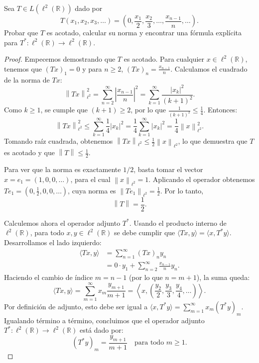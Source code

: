 \documentclass{article}
\theoremstyle{definition}
\newcommand{\R}{\mathbb{R}}
\newcommand{\norm}[1]{\left\lVert #1 \right\rVert}       %
\newenvironment{ejercicio}[1]{\begin{trivlist}
\item[\hskip \labelsep {\bfseries Ejercicio}\hskip \labelsep {\bfseries #1.}]}{\end{trivlist}}
\begin{document}
\begin{ejercicio}{7}
	Sea \( T\in L(\ell^{2}(\R)) \) dado por
	\[ T(x_{1},x_{2},x_{3},\dots) = \left( 0, \frac{x_{1}}{2}, \frac{x_{2}}{3}, \dots, \frac{x_{n-1}}{n}, \dots \right). \]
	Probar que \( T \) es acotado, calcular su norma y encontrar una fórmula explícita para \( T^{*}:\ell^{2}(\R)\rightarrow \ell^{2}(\R) \).
\end{ejercicio}
\begin{proof}
	Empecemos demostrando que \(T\) es acotado. Para cualquier \(x \in \ell^2(\R)\), tenemos que \((Tx)_1 = 0\) y para \(n \ge 2\), \((Tx)_n = \frac{x_{n-1}}{n}\). Calculamos el cuadrado de la norma de \(Tx\):
	\[
		\norm{Tx}_{\ell^2}^2 = \sum_{n=2}^{\infty} \left| \frac{x_{n-1}}{n} \right|^2 = \sum_{k=1}^{\infty} \frac{|x_k|^2}{(k+1)^2}.
	\]
	Como \(k \ge 1\), se cumple que \((k+1) \ge 2\), por lo que \(\frac{1}{(k+1)^2} \le \frac{1}{4}\). Entonces:
	\[
		\norm{Tx}_{\ell^2}^2 \le \sum_{k=1}^{\infty} \frac{1}{4} |x_k|^2 = \frac{1}{4} \sum_{k=1}^{\infty} |x_k|^2 = \frac{1}{4} \norm{x}_{\ell^2}^2.
	\]
	Tomando raíz cuadrada, obtenemos \(\norm{Tx}_{\ell^2} \le \frac{1}{2} \norm{x}_{\ell^2}\), lo que demuestra que \(T\) es acotado y que \(\norm{T} \le \frac{1}{2}\).

	Para ver que la norma es exactamente \(1/2\), basta tomar el vector \(x = e_1 = (1, 0, 0, \dots)\), para el cual \(\norm{x}_{\ell^2} = 1\). Aplicando el operador obtenemos \(Te_1 = \left( 0, \frac{1}{2}, 0, 0, \dots \right)\), cuya norma es \(\norm{Te_1}_{\ell^2} = \frac{1}{2}\). Por lo tanto,
	\[
		\norm{T} = \frac{1}{2}.
	\]

	Calculemos ahora el operador adjunto \(T^*\). Usando el producto interno de \(\ell^2(\R)\), para todo \(x, y \in \ell^2(\R)\) se debe cumplir que \( \langle Tx, y \rangle = \langle x, T^*y \rangle \). Desarrollamos el lado izquierdo:
	\begin{align*}
		\langle Tx, y \rangle & = \sum_{n=1}^{\infty} {(Tx)}_n y_n                         \\
		                      & = 0 \cdot y_1 + \sum_{n=2}^{\infty} \frac{x_{n-1}}{n} y_n.
	\end{align*}
	Haciendo el cambio de índice \(m = n - 1\) (por lo que \(n = m + 1\)), la suma queda:
	\[
		\langle Tx, y \rangle = \sum_{m=1}^{\infty} x_m \frac{y_{m+1}}{m+1} = \left\langle x, \left( \frac{y_2}{2}, \frac{y_3}{3}, \frac{y_4}{4}, \dots \right) \right\rangle.
	\]
	Por definición de adjunto, esto debe ser igual a \(\langle x, T^*y \rangle = \sum_{m=1}^{\infty} x_m {(T^*y)}_m\). Igualando término a término, concluimos que el operador adjunto \(T^*: \ell^2(\R) \rightarrow \ell^2(\R)\) está dado por:
	\[
		{(T^*y)}_m = \frac{y_{m+1}}{m+1} \quad \text{para todo } m \ge 1.
	\]
\end{proof}
\end{document}
